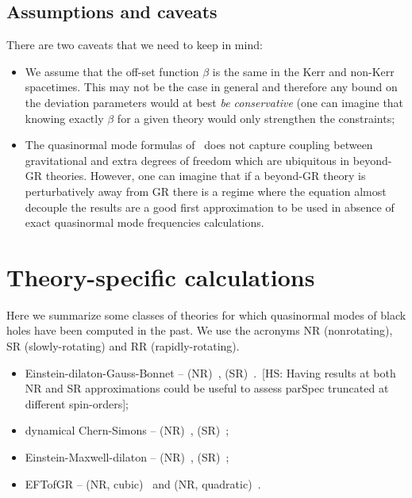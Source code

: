 \documentclass[aps,10pt,preprint,
               notitlepage,onecolumn,superscriptaddress,
               eqsecnum,
               nofootinbib,tightenlines,floatfix]{revtex4-1}
\newcommand{\hs}[1]{{\color{magenta}[HS: #1]}}
\begin{document}
\subsection{Assumptions and caveats}
%
There are two caveats that we need to keep in mind:
%
\begin{itemize}
\item We assume that the off-set function $\beta$ is the same in the Kerr and
non-Kerr spacetimes. This may not be the case in general and therefore any
bound on the deviation parameters would at best \emph{be conservative} (one can
imagine that knowing exactly $\beta$ for a given theory would only strengthen
the constraints;
%
\item The quasinormal mode formulas of~\cite{Glampedakis:2017dvb} does not
capture coupling between gravitational and extra degrees of freedom which
are ubiquitous in beyond-GR theories.
%
However, one can imagine that if a beyond-GR theory is perturbatively away from
GR there is a regime where the equation almost decouple the results are a
good first approximation to be used in absence of exact quasinormal mode
frequencies calculations.
\end{itemize}

\section{Theory-specific calculations}

Here we summarize some classes of theories for which quasinormal modes
of black holes have been computed in the past. We use the acronyms NR (nonrotating),
SR (slowly-rotating) and RR (rapidly-rotating).

\begin{itemize}
    \item Einstein-dilaton-Gauss-Bonnet -- (NR)~\cite{Blazquez-Salcedo:2016enn},
        (SR)~\cite{Pierini:2021jxd}.~\hs{Having results at both NR and SR approximations
        could be useful to assess {\sc parSpec} truncated at different spin-orders};
    \item dynamical Chern-Simons -- (NR)~\cite{Molina:2010fb}, (SR)~\cite{Wagle:2021tam,Srivastava:2021imr};
    \item Einstein-Maxwell-dilaton -- (NR)~\cite{Ferrari:1984zz}, (SR)~\cite{Brito:2018hjh};
    \item EFTofGR -- (NR, cubic)~\cite{deRham:2020ejn} and (NR, quadratic)~\cite{Cardoso:2018ptl}.
\end{itemize}
\end{document}

